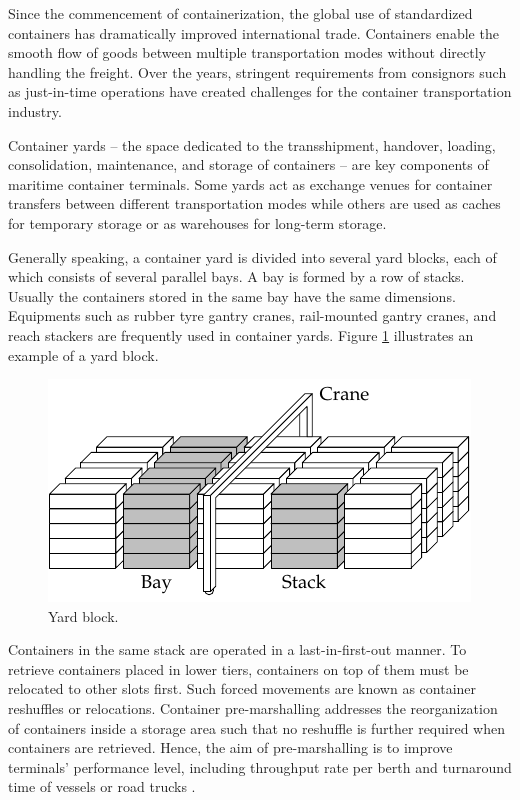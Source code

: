 \documentclass[review,3p,times,12pt,number]{elsarticle}\usepackage{amsmath}\usepackage{amssymb}
\begin{document}
Since the commencement of containerization, the global use of standardized containers has dramatically improved international trade. Containers enable the smooth flow of goods between multiple transportation modes without directly handling the freight. Over the years, stringent requirements from consignors such as just-in-time operations have created challenges for the container transportation industry.

Container yards -- the space dedicated to the transshipment, handover, loading, consolidation, maintenance, and storage of containers -- are key components of maritime container terminals. Some yards act as exchange venues for container transfers between different transportation modes while others are used as caches for temporary storage or as warehouses for long-term storage.

Generally speaking, a container yard is divided into several yard blocks, each of which consists of several parallel bays.  A bay is formed by a row of stacks. Usually the containers stored in the same bay have the same dimensions. Equipments such as rubber tyre gantry cranes, rail-mounted gantry cranes, and reach stackers are frequently used in container yards. Figure \ref{fig:block} illustrates an example of a yard block.

\begin{figure}[htbp]
\centering
\includegraphics{figs/block.pdf}
\caption{Yard block.}
\label{fig:block}
\end{figure}

Containers in the same stack are operated in a last-in-first-out manner. To retrieve containers placed in lower tiers, containers on top of them must be relocated to other slots first. Such forced movements are known as container reshuffles or relocations.
Container pre-marshalling addresses the reorganization of containers inside a storage area such that no reshuffle is further required when containers are retrieved. Hence, the aim of pre-marshalling is to improve terminals' performance level, including throughput rate per berth and turnaround time of vessels or road trucks \citep{kim2015}.
\end{document}
